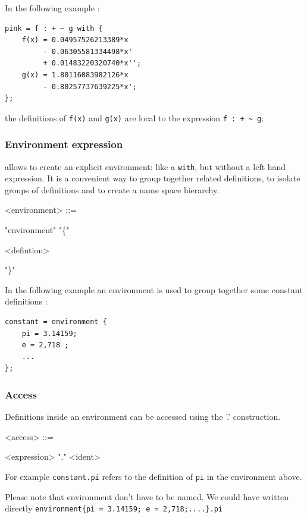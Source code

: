\documentclass[a4paper]{book}
\begin{document}
In the following example :
\begin{lstlisting}
pink = f : + ~ g with {
	f(x) = 0.04957526213389*x 
		 - 0.06305581334498*x' 
         + 0.01483220320740*x'';
	g(x) = 1.80116083982126*x 
		 - 0.80257737639225*x';
};
\end{lstlisting}
the definitions of \lstinline'f(x)' and \lstinline'g(x)' are local to the expression \lstinline'f : + ~ g':

\subsubsection{Environment expression} allows to create an explicit environment: like a \lstinline'with', but without a left hand expression. It is a convenient way to group together related definitions, to isolate groups of definitions and to create a name space hierarchy. 

\begin{grammar}
  <environment> ::= 
  \begin{syntdiag}
      "environment" "\{"
        \begin{rep}
          <defintion>
        \end{rep}
        "\}"
  \end{syntdiag}
\end{grammar}

In the following example an environment is used to group together some constant definitions :

\begin{lstlisting}
constant = environment {
	pi = 3.14159;
	e = 2,718 ;
	...
};
\end{lstlisting}

\subsubsection{Access} Definitions inside an environment can be accessed using 
the '.' construction. 

\begin{grammar}
  <access> ::= 
  \begin{syntdiag}
      <expression> "." <ident>
  \end{syntdiag}
\end{grammar}

For example \lstinline'constant.pi' refers to the definition of \lstinline'pi' in the environment above.

Please note that environment don't have to be named. We could have written directly 
\lstinline'environment{pi = 3.14159; e = 2,718;....}.pi'
\end{document}
